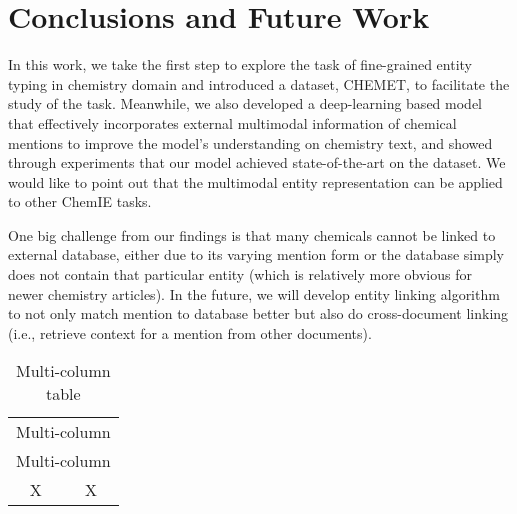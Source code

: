 

\section{Conclusions and Future Work}


In this work, we take the first step to  explore the task of fine-grained entity typing in chemistry domain and introduced a dataset, CHEMET, to facilitate the study of the task. Meanwhile, we also developed a  deep-learning based model that effectively incorporates external multimodal information of chemical mentions to improve the model's understanding on chemistry text, and showed through experiments that our model achieved state-of-the-art on the dataset. We would like to point out that the multimodal entity representation can be applied to other ChemIE tasks.

One big challenge from our findings is that many chemicals cannot be linked to external database, either due to its varying mention form or the database simply does not contain that particular entity (which is relatively more obvious for newer chemistry articles). In the future, we will develop entity linking algorithm to not only match mention to database better but also do cross-document linking (i.e., retrieve context for a mention from other documents).

\begin{table}[ht]
	\caption{Multi-column table}
	\begin{center}
		\begin{tabular}{cc}
			\hline
			\multicolumn{2}{c}{Multi-column}\\
			\multicolumn{2}{c}{Multi-column}\\
			X&X\\
			\hline
		\end{tabular}
	\end{center}
	\label{tab:multicol}
\end{table}


